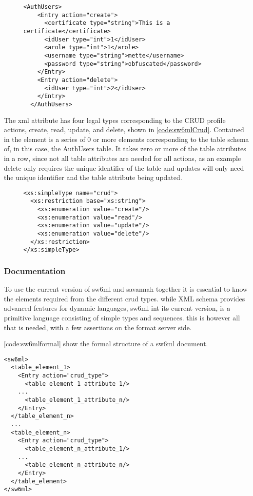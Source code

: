 \begin{figure}[H]
\begin{lstlisting}[label=code:sw6mlExample01,caption=Example of sw6ml syntax]
 <AuthUsers>
    <Entry action="create">
      <certificate type="string">This is a certificate</certificate>
      <idUser type="int">1</idUser>
      <arole type="int">1</arole>
      <username type="string">mette</username>
      <password type="string">obfuscated</password>
    </Entry>
    <Entry action="delete">
      <idUser type="int">2</idUser>
    </Entry>
  </AuthUsers>
\end{lstlisting}
\end{figure}
The  xml attribute has four legal types corresponding to the CRUD profile actions, create, read, update, and delete, shown in \autoref{code:sw6mlCrud}.
Contained in the   element is a series of 0 or more elements corresponding to the table schema of, in this case, the AuthUsers table.
It takes zero or more of the table attributes in a row, since not all table attributes are needed for all actions, as an example delete only requires the unique identifier of the table and
updates will only need the unique identifier and the table attribute being updated.
\begin{figure}[H]
\begin{lstlisting}[label=code:sw6mlCrud,caption=sw6ml crud simple type]
 <xs:simpleType name="crud">
  <xs:restriction base="xs:string">
    <xs:enumeration value="create"/>
    <xs:enumeration value="read"/>
    <xs:enumeration value="update"/>
    <xs:enumeration value="delete"/>
  </xs:restriction>
</xs:simpleType>
\end{lstlisting}
\end{figure}

\subsubsection{Documentation}
\label{sw6mlusage}
To use the current version of sw6ml and savannah together it is essential to know the elements required from the different crud types.
while XML schema provides advanced features for dynamic languages, sw6ml int its current version, is a primitive language consisting of simple types and sequences.
this is however all that is needed, with a few assertions on the format server side.

\autoref{code:sw6mlformal} show the formal structure of a sw6ml document.
\begin{Code}
\begin{lstlisting}[label=code:sw6mlformal,caption=root and table elements]
<sw6ml> 
  <table_element_1>
    <Entry action="crud_type">
      <table_element_1_attribute_1/>
	...
      <table_element_1_attribute_n/>
    </Entry>
  </table_element_n>
  ...
  <table_element_n>
    <Entry action="crud_type">
      <table_element_n_attribute_1/>
	...
      <table_element_n_attribute_n/>
    </Entry>
  </table_element>
</sw6ml>
\end{lstlisting}
\end{Code}


